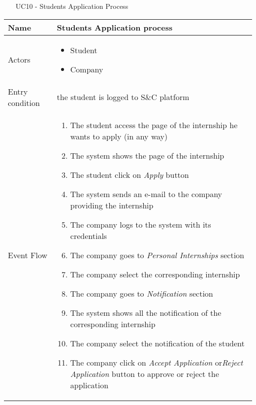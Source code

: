 				
			
				
				\begin{table} [H]
					\centering
						\begin{itemize}
						\item [UC10] - Students Application Process
					\end{itemize}
					\begin{tabular}{|| P{7.5cm} | P{7.5cm} ||}
						\hline
						Name & Students Application process \\
						\hline
						Actors & \parbox{5cm}{\begin{itemize}
								\item Student
								\item Company
							\end{itemize}
						} \\
						\hline
						Entry condition & the student is logged to S\&C platform \\
						\hline
						Event Flow & \parbox{5cm}{\begin{enumerate}[label=\alpha]
								\item The student access the page of the 
								internship he wants to apply (in any way) 
								\item The system shows the page of the 
								internship 
								\item The student click on \textit{Apply} button
								\item  The system sends an e-mail to the 
								company providing the internship
								\item The company logs to the system with 
								its credentials
								\item The company goes to \textit{Personal 
								Internships} section
								\item The company select the 
								corresponding internship
								\item The company goes to \textit{Notification} 
								section 
								\item The system shows all the notification 
								of the corresponding internship
								\item The company select the notification 
								of the student 
								\item The company click on \textit{Accept 
								Application} or\textit{Reject Application}
								button to approve or reject the 
								application
						\end{enumerate}} \\
						\hline 

\end{tabular}
\end{table}
